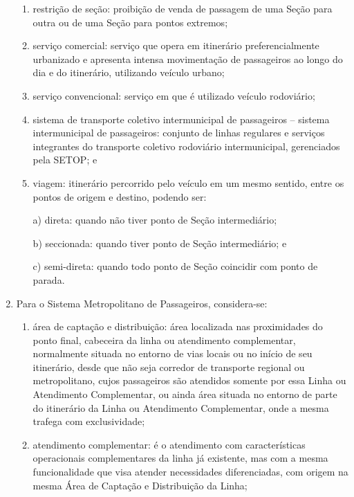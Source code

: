 \begin{enumerate}[resume,label=Art. \arabic*]
\begin{enumerate}[label=\roman*.]
\item restrição de seção: proibição de venda de passagem de uma Seção para outra ou de uma Seção para pontos extremos;

\item serviço comercial: serviço que opera em itinerário preferencialmente urbanizado e apresenta intensa movimentação de passageiros ao longo do dia e do itinerário, utilizando veículo urbano;

\item serviço convencional: serviço em que é utilizado veículo rodoviário;

\item sistema de transporte coletivo intermunicipal de passageiros – sistema intermunicipal de passageiros: conjunto de linhas regulares e serviços integrantes do transporte coletivo rodoviário intermunicipal, gerenciados pela SETOP; e

\item viagem: itinerário percorrido pelo veículo em um mesmo sentido, entre os pontos de origem e destino, podendo ser:

a) direta: quando não tiver ponto de Seção intermediário;

b) seccionada: quando tiver ponto de Seção intermediário; e

c) semi-direta: quando todo ponto de Seção coincidir com ponto de parada.

\end{enumerate}

\item Para o Sistema Metropolitano de Passageiros, considera-se:

\begin{enumerate}[label=\roman*.]

\item área de captação e distribuição: área localizada nas proximidades do ponto final, cabeceira da linha ou atendimento complementar, normalmente situada no entorno de vias locais ou no início de seu itinerário, desde que não seja corredor de transporte regional ou metropolitano, cujos passageiros são atendidos somente por essa Linha ou Atendimento Complementar, ou ainda área situada no entorno de parte do itinerário da Linha ou Atendimento Complementar, onde a mesma trafega com exclusividade;

\item atendimento complementar: é o atendimento com características operacionais complementares da linha já existente, mas com a mesma funcionalidade que visa atender necessidades diferenciadas, com origem na mesma Área de Captação e Distribuição da Linha;


\end{enumerate}
\end{enumerate}
